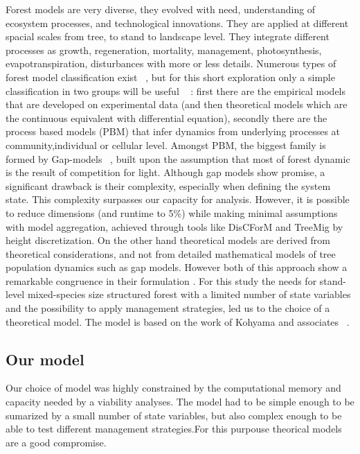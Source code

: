 \documentclass{article}
\begin{document}
Forest models are very diverse, they evolved with need, understanding of ecosystem processes, and technological innovations. They are applied at different spacial scales from tree, to stand to landscape level. They integrate different processes as growth, regeneration, mortality, management, photosynthesis, evapotranspiration, disturbances with more or less details. Numerous types of forest model classification exist ~\autocite{porteModellingMixedForest2002}, but for this short exploration only a simple classification in two groups will be useful ~\autocite{fontesModelsSupportingForest2011} : first there are the empirical models that are developed on experimental data (and then theoretical models which are the continuous equivalent with differential equation), secondly there are the process based models (PBM) that infer dynamics from underlying processes at community,individual or cellular level. Amongst PBM, the biggest family is formed by Gap-models ~\autocite{bugmannREVIEWFORESTGAP2001}, built upon the assumption that most of forest dynamic is the result of competition for light.
Although gap models show promise, a significant drawback is their complexity, especially when defining the system state. This complexity surpasses our capacity for analysis. However, it is possible to reduce dimensions (and runtime to 5\%) while making minimal assumptions with model aggregation, achieved through tools like DisCForM and TreeMig \autocite{lischkeAggregationIndividualTrees1998,lischkeTreeMigForestlandscapeModel2006} by height discretization.
On the other hand theoretical models are derived from theoretical considerations, and not from detailed mathematical models of tree population dynamics such as gap models. However both of this approach show a remarkable congruence in their formulation \autocite{bugmannREVIEWFORESTGAP2001}.
For this study the needs for stand-level mixed-species size structured forest with a limited number of state variables and the possibility to apply management strategies, led us to the choice of a theoretical model. The model is based on the work of Kohyama and associates ~\autocite{kohyamaStratificationTheoryPlant2009, kohyamaOnesidedCompetitionLight2012}.

\subsection{Our model}

Our choice of model was highly constrained by the computational memory and capacity needed by a viability analyses. The model had to be simple enough to be sumarized by a small number of state variables, but also complex enough to be able to test different management strategies.For this purpouse theorical models are a good compromise.\\
\end{document}
